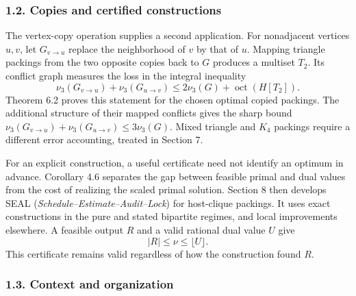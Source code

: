 \documentclass[english,11pt,a4paper]{article}
\begin{document}
\subsubsection{1.2. Copies and certified
constructions}\label{copies-and-certified-constructions}

The vertex-copy operation supplies a second application. For nonadjacent
vertices \(u,v\), let \(G_{v\to u}\) replace the neighborhood of \(v\)
by that of \(u\). Mapping triangle packings from the two opposite copies
back to \(G\) produces a multiset \(T_2\). Its conflict graph measures
the loss in the integral inequality \[
\nu_3(G_{v\to u})+\nu_3(G_{u\to v})
\le 2\nu_3(G)+\operatorname{oct}(H[T_2]).
\] Theorem 6.2 proves this statement for the chosen optimal copied
packings. The additional structure of their mapped conflicts gives the
sharp bound \(\nu_3(G_{v\to u})+\nu_3(G_{u\to v})\le3\nu_3(G)\). Mixed
triangle and \(K_4\) packings require a different error accounting,
treated in Section 7.

For an explicit construction, a useful certificate need not identify an
optimum in advance. Corollary 4.6 separates the gap between feasible
primal and dual values from the cost of realizing the scaled primal
solution. Section 8 then develops SEAL
(\emph{Schedule--Estimate--Audit--Lock}) for host-clique packings. It
uses exact constructions in the pure and stated bipartite regimes, and
local improvements elsewhere. A feasible output \(R\) and a valid
rational dual value \(U\) give \[
|R|\le\nu\le\lfloor U\rfloor.
\] This certificate remains valid regardless of how the construction
found \(R\).

\subsubsection{1.3. Context and
organization}\label{context-and-organization}
\end{document}
